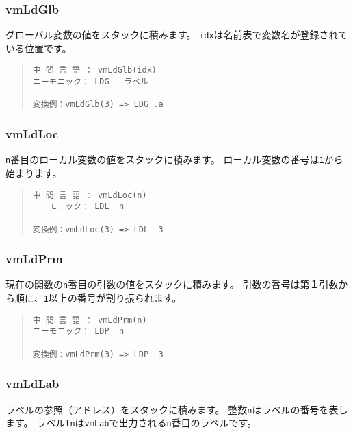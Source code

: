 \subsubsection{vmLdGlb}

グローバル変数の値をスタックに積みます。
\verb/idx/は名前表で変数名が登録されている位置です。

\begin{quote}
\begin{verbatim}
中 間 言 語 ： vmLdGlb(idx)
ニーモニック： LDG   ラベル

変換例：vmLdGlb(3) => LDG .a
\end{verbatim}
\end{quote}

\subsubsection{vmLdLoc}

\verb/n/番目のローカル変数の値をスタックに積みます。
ローカル変数の番号は\verb/1/から始まります。

\begin{quote}
\begin{verbatim}
中 間 言 語 ： vmLdLoc(n)
ニーモニック： LDL  n   

変換例：vmLdLoc(3) => LDL  3
\end{verbatim}
\end{quote}

\subsubsection{vmLdPrm}

現在の関数の\verb/n/番目の引数の値をスタックに積みます。
引数の番号は第１引数から順に、\verb/1/以上の番号が割り振られます。

\begin{quote}
\begin{verbatim}
中 間 言 語 ： vmLdPrm(n)
ニーモニック： LDP  n   

変換例：vmLdPrm(3) => LDP  3
\end{verbatim}
\end{quote}

\subsubsection{vmLdLab}

ラベルの参照（アドレス）をスタックに積みます。
整数\verb/n/はラベルの番号を表します。
ラベル\verb/ln/は\verb/vmLab/で出力される\verb/n/番目のラベルです。

